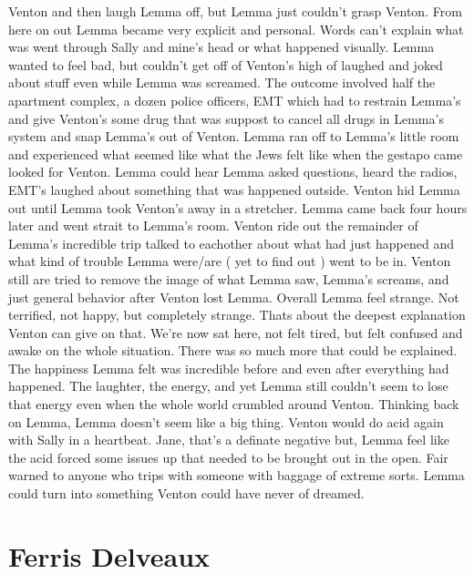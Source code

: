 \documentclass[12pt]{book}
\begin{document}
Venton and then laugh Lemma off, but Lemma just couldn't grasp Venton. From here on out Lemma became very explicit and personal. Words can't explain what was went through Sally and mine's head or what happened visually. Lemma wanted to feel bad, but couldn't get off of Venton's high of laughed and joked about stuff even while Lemma was screamed. The outcome involved half the apartment complex, a dozen police officers, EMT which had to restrain Lemma's and give Venton's some drug that was suppost to cancel all drugs in Lemma's system and snap Lemma's out of Venton. Lemma ran off to Lemma's little room and experienced what seemed like what the Jews felt like when the gestapo came looked for Venton. Lemma could hear Lemma asked questions, heard the radios, EMT's laughed about something that was happened outside. Venton hid Lemma out until Lemma took Venton's away in a stretcher. Lemma came back four hours later and went strait to Lemma's room. Venton ride out the remainder of Lemma's incredible trip talked to eachother about what had just happened and what kind of trouble Lemma were/are ( yet to find out ) went to be in. Venton still are tried to remove the image of what Lemma saw, Lemma's screams, and just general behavior after Venton lost Lemma. Overall Lemma feel strange. Not terrified, not happy, but completely strange. Thats about the deepest explanation Venton can give on that. We're now sat here, not felt tired, but felt confused and awake on the whole situation. There was so much more that could be explained. The happiness Lemma felt was incredible before and even after everything had happened. The laughter, the energy, and yet Lemma still couldn't seem to lose that energy even when the whole world crumbled around Venton. Thinking back on Lemma, Lemma doesn't seem like a big thing. Venton would do acid again with Sally in a heartbeat. Jane, that's a definate negative but, Lemma feel like the acid forced some issues up that needed to be brought out in the open. Fair warned to anyone who trips with someone with baggage of extreme sorts. Lemma could turn into something Venton could have never of dreamed.






\chapter{Ferris Delveaux}
\end{document}
